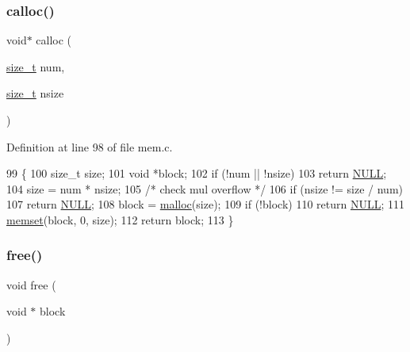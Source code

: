 \subsubsection{\texorpdfstring{calloc()}{calloc()}}
{\footnotesize\ttfamily void$\ast$ calloc (\begin{DoxyParamCaption}\item[{\hyperlink{a00140_a29d85914ddff32967d85ada69854206d_a29d85914ddff32967d85ada69854206d}{size\+\_\+t}}]{num,  }\item[{\hyperlink{a00140_a29d85914ddff32967d85ada69854206d_a29d85914ddff32967d85ada69854206d}{size\+\_\+t}}]{nsize }\end{DoxyParamCaption})}



Definition at line 98 of file mem.\+c.


\begin{DoxyCode}
99 \{
100     \textcolor{keywordtype}{size\_t} size;
101     \textcolor{keywordtype}{void} *block;
102     \textcolor{keywordflow}{if} (!num || !nsize)
103         \textcolor{keywordflow}{return} \hyperlink{a00140_a070d2ce7b6bb7e5c05602aa8c308d0c4_a070d2ce7b6bb7e5c05602aa8c308d0c4}{NULL};
104     size = num * nsize;
105     \textcolor{comment}{/* check mul overflow */}
106     \textcolor{keywordflow}{if} (nsize != size / num)
107         \textcolor{keywordflow}{return} \hyperlink{a00140_a070d2ce7b6bb7e5c05602aa8c308d0c4_a070d2ce7b6bb7e5c05602aa8c308d0c4}{NULL};
108     block = \hyperlink{a00167_a7ac38fce3243a7dcf448301ee9ffd392_a7ac38fce3243a7dcf448301ee9ffd392}{malloc}(size);
109     \textcolor{keywordflow}{if} (!block)
110         \textcolor{keywordflow}{return} \hyperlink{a00140_a070d2ce7b6bb7e5c05602aa8c308d0c4_a070d2ce7b6bb7e5c05602aa8c308d0c4}{NULL};
111     \hyperlink{a00131_a9e432f267691eceb2e2e0efcc37efbc9_a9e432f267691eceb2e2e0efcc37efbc9}{memset}(block, 0, size);
112     \textcolor{keywordflow}{return} block;
113 \}
\end{DoxyCode}
\mbox{\label{a00167_abbcfa46e4bdcb73aecd859a389031a02_abbcfa46e4bdcb73aecd859a389031a02}} 
\subsubsection{\texorpdfstring{free()}{free()}}
{\footnotesize\ttfamily void free (\begin{DoxyParamCaption}\item[{void $\ast$}]{block }\end{DoxyParamCaption})}



